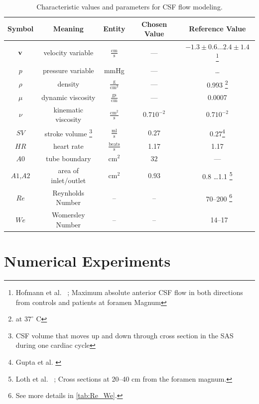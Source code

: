 \begin{table}\begin{minipage}{\textwidth}\begin{center}
    \begin{tabular}{ | c | c | c | c | c | }
    \hline
    Symbol & Meaning & Entity & Chosen Value & Reference Value\\ \hline\hline
	$\mathbf{v}$	& velocity variable & $\mathrm{ \frac{cm}{s}}$ & --- & $-1.3\pm 0.6 \ldots 2.4 \pm 1.4$ \footnote{Hofmann et al. ~\cite{Hofmann2000}; Maximum absolute anterior CSF flow in both directions from controls and patients at foramen Magnum} \\ 
	$p$		& pressure	variable & mmHg & --- & \ldots\\
	$\rho$	& density & $\mathrm{\frac{g}{cm^3}}$ & --- &0.993 \footnote{at $37^\circ$ C }\\ %
	$\mu$	& dynamic viscosity	&  $\mathrm{\frac{g s}{cm}}$ & --- & 0.0007\\
	$\nu$	& kinematic viscosity & $\mathrm{ \frac{cm^2}{s}}$ & $0.7 10^{-2}$ & $0.7 10^{-2}$ \\ 	\hline %
	$SV$	& stroke volume \footnote{CSF volume that moves up and down through cross section in the SAS during one cardiac cycle}	& $\mathrm{ \frac{ml}{s}}$& $0.27$  & $0.27$\footnote{Gupta et al. \cite{Gupta2009}} \\
	$HR$	& heart rate & $\mathrm{\frac{beats}{s}}$	& 1.17 & 1.17\\
	$A0$	& tube boundary	& $\mathrm{ cm^2}$ & $32$  & ---\\
	$A1$,$A2$	& area of inlet/outlet & $\mathrm{ cm^2}$ &$0.93$ & 0.8 \ldots 1.1 \footnote{Loth et al. ~\cite{Loth2001}; Cross sections at 20--40 cm from the foramen magnum.}  \\
    \hline
    $Re$    & Reynholds Number & -- & -- & ~70--200 \footnote{See more details in \ref{tab:Re_We}.}\\
    $We$    & Womersley Number & -- & -- & ~14--17 \\
    \hline
    \end{tabular}
	\label{tab:entities}
	\caption{Characteristic values and parameters for CSF flow modeling.}
\end{center}\end{minipage}\end{table}

\section{Numerical Experiments} 
